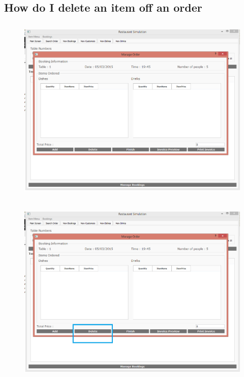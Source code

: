 \subsection{How do I delete an item off an order}

\begin{figure}[H]
    \includegraphics[height = 9cm]{./Manual/images/base/ManageOrder} 
    \caption{} \label{fig:additemorder1}
\end{figure}

\begin{figure}[H]
    \includegraphics[height = 9cm]{./Manual/images/DeleteItemOrder1} 
    \caption{} \label{fig:deleteitemorder2}
\end{figure}

